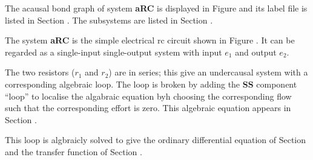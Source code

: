 

   The acausal bond graph of system \textbf{aRC} is
   displayed in Figure  and its label
   file is listed in Section .
   The subsystems are listed in Section .

The system \textbf{aRC} is the simple electrical rc circuit shown in
Figure . It can be regarded as a single-input
single-output system with input $e_1$ and output $e_2$.

The two resistors ($r_1$ and $r_2$) are in series; this give an
undercausal system with a corresponding algebraic loop. The loop is
broken by adding the {\bf SS} component ``loop'' to localise the
algabraic equation byh choosing the corresponding flow such that the
corresponding effort is zero. This algebraic equation appears in
Section .

This loop is algbraicly solved to give the ordinary differential
equation of Section  and the transfer function of
Section .
